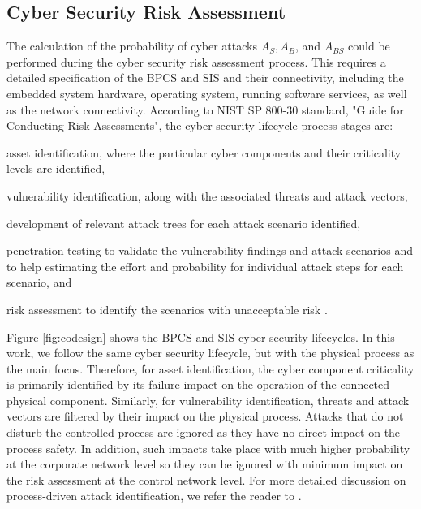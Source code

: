 \documentclass[journal]{IEEEtran}
\newcommand{\blue}[1]{\textcolor{blue}{#1}}
\begin{document}

\subsection{Cyber Security Risk Assessment}
The calculation of the probability of cyber attacks $A_S,A_B$, and $A_{BS}$ could be performed during the cyber security risk assessment process. This requires a detailed specification of the BPCS and SIS and their connectivity, including the embedded system hardware, operating system, running software services, as well as the network connectivity. According to NIST SP 800-30 standard, "Guide for Conducting Risk Assessments", the cyber security lifecycle process stages are: \begin{inparaenum}[(1)] \item asset identification, where the particular cyber components and their criticality levels are identified, \item vulnerability identification, along with the associated threats and attack vectors, \item development of relevant attack trees for each attack scenario identified, \item penetration testing to validate the vulnerability findings and attack scenarios and to help estimating the effort and probability for individual attack steps for each scenario, and \item risk assessment to identify the scenarios with unacceptable risk \cite{stoneburner2002}. \end{inparaenum} Figure \ref{fig:codesign} shows the BPCS and SIS cyber security lifecycles. In this work, we follow the same cyber security lifecycle, but with the physical process as the main focus. Therefore, for asset identification, the cyber component criticality is primarily identified by its failure impact on the operation of the connected physical component. Similarly, for vulnerability identification, threats and attack vectors are filtered by their impact on the physical process. Attacks that do not disturb the controlled process are ignored as they have no direct impact on the process safety. In addition, such impacts take place with much higher probability at the corporate network level so they can be ignored with minimum impact on the risk assessment at the control network level. For more detailed discussion on process-driven attack identification, we refer the reader to \cite{Tantawy2020}.
\end{document}
